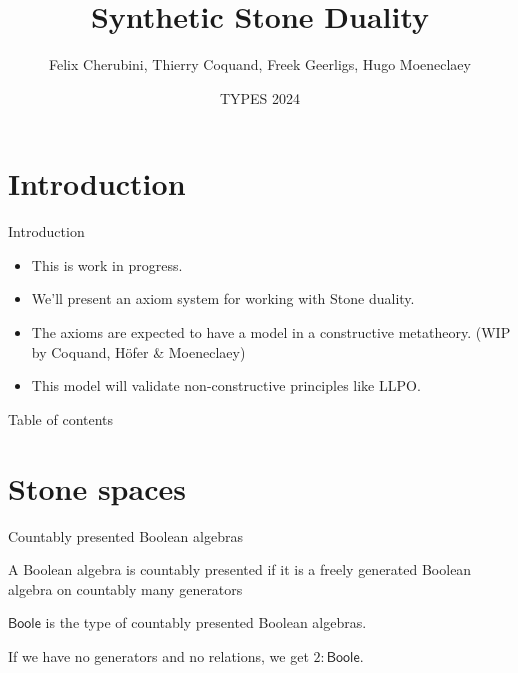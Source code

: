 \documentclass{beamer}
\newcommand{\Boole}{\mathsf{Boole}}
\newtheorem{remark}{Remark}
\begin{document}
\section{Introduction}

\title{Synthetic Stone Duality}
\date{TYPES 2024}
\author{
Felix Cherubini, Thierry Coquand, Freek Geerligs, Hugo Moeneclaey}
\maketitle
\begin{frame}{Introduction}
  \begin{itemize}
    \item This is work in progress. 
      \pause 
    \item We'll present an axiom system for working with Stone duality. 
      \pause 
    \item The axioms are expected to have a model in a constructive metatheory. 
      (WIP by Coquand, H\"ofer \& Moeneclaey)
      \pause
    \item 
      This model will validate non-constructive principles like LLPO. 
  \end{itemize}
\end{frame}
\begin{frame}{Table of contents}
\tableofcontents
\end{frame}

  \section{Stone spaces}%
\begin{frame}{Countably presented Boolean algebras}
  \begin{definition}
    A Boolean algebra is countably presented if it is a 
    \pause 
    freely generated Boolean algebra on countably many generators 
  \end{definition}
  \pause 
  \pause
  \begin{definition}
    $\Boole$ is the type of countably presented Boolean algebras. 
  \end{definition}
  \pause 
  \begin{example}
    If we have no generators and no relations, we get $2:\Boole$.
  \end{example}
\end{frame}
\end{document}
